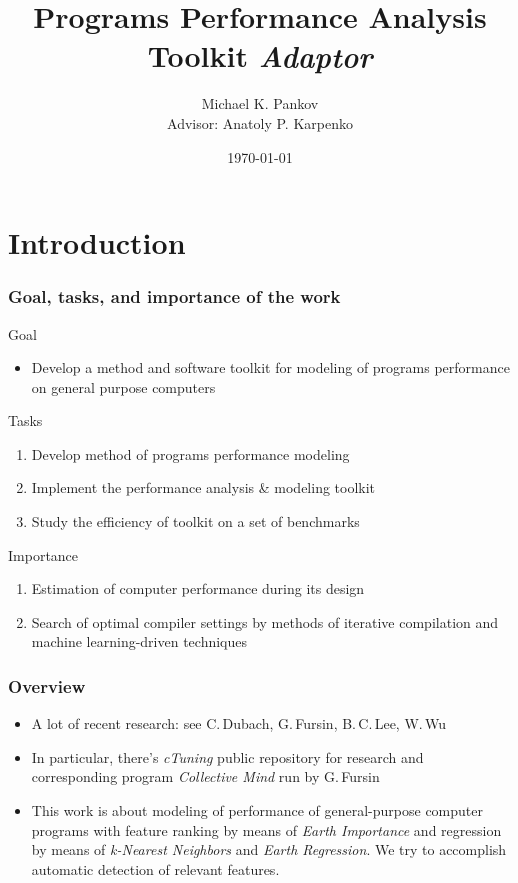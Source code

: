 \documentclass{beamer}
\title{Programs Performance Analysis Toolkit \textit{Adaptor}}
\author{Michael K. Pankov\\Advisor: Anatoly P. Karpenko}
\institute{Bauman Moscow State Technical University}
\date{\today}
\begin{document}
\maketitle

\section{Introduction}

\begin{frame}
\frametitle{Goal, tasks, and importance of the work}

\begin{block}{Goal}
	\begin{itemize}
		\item Develop a method and software toolkit for modeling of programs performance on general purpose computers
	\end{itemize}
\end{block}

\begin{block}{Tasks}
	\begin{enumerate}
		\item Develop method of programs performance modeling
		\item Implement the performance analysis \& modeling toolkit
		\item Study the efficiency of toolkit on a set of benchmarks
	\end{enumerate}
\end{block}

\begin{block}{Importance}
	\begin{enumerate}
		\item Estimation of computer performance during its design
		\item Search of optimal compiler settings by methods of iterative compilation and machine learning-driven techniques
	\end{enumerate}
\end{block}

\end{frame}

\begin{frame}
\frametitle{Overview}

	\begin{itemize}
		\item A lot of recent research: see C.\,Dubach, G.\,Fursin, B.\,C.\,Lee, W.\,Wu
		\item In particular, there's \textit{cTuning} public repository for research and corresponding program \textit{Collective Mind} run by G.\,Fursin
		\item This work is about modeling of performance of general-purpose computer programs with feature ranking by means of \textit{Earth Importance} and regression by means of \textit{k-Nearest Neighbors} and \textit{Earth Regression}. We try to accomplish automatic detection of relevant features.
	\end{itemize}
\end{frame}
\end{document}
